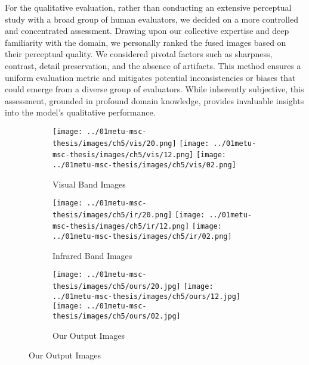 For the qualitative evaluation, rather than conducting an extensive perceptual study with a broad group of human evaluators, we decided on a more controlled and concentrated assessment. Drawing upon our collective expertise and deep familiarity with the domain, we personally ranked the fused images based on their perceptual quality. We considered pivotal factors such as sharpness, contrast, detail preservation, and the absence of artifacts. This method ensures a uniform evaluation metric and mitigates potential inconsistencies or biases that could emerge from a diverse group of evaluators. While inherently subjective, this assessment, grounded in profound domain knowledge, provides invaluable insights into the model's qualitative performance.

\begin{figure}[htbp]
    \centering
    \begin{subfigure}[b]{\textwidth}
        \texttt{[image: ../01metu-msc-thesis/images/ch5/vis/20.png]}
        \texttt{[image: ../01metu-msc-thesis/images/ch5/vis/12.png]}
        \texttt{[image: ../01metu-msc-thesis/images/ch5/vis/02.png]}
        \caption{Visual Band Images}
        \label{fig:ch5:met5:vis}
    \end{subfigure}
    \vspace{0.01cm}
    \begin{subfigure}[b]{\textwidth}
        \texttt{[image: ../01metu-msc-thesis/images/ch5/ir/20.png]}
        \texttt{[image: ../01metu-msc-thesis/images/ch5/ir/12.png]}
        \texttt{[image: ../01metu-msc-thesis/images/ch5/ir/02.png]}
        \caption{Infrared Band Images}
        \label{fig:ch5:met5:ir}
    \end{subfigure}
    \vspace{0.01cm}
    \begin{subfigure}[b]{\textwidth}
        \texttt{[image: ../01metu-msc-thesis/images/ch5/ours/20.jpg]}
        \texttt{[image: ../01metu-msc-thesis/images/ch5/ours/12.jpg]}
        \texttt{[image: ../01metu-msc-thesis/images/ch5/ours/02.jpg]}
        \caption{Our Output Images}
        \label{fig:ch5:met5:ours}
    \end{subfigure}

\end{figure}
